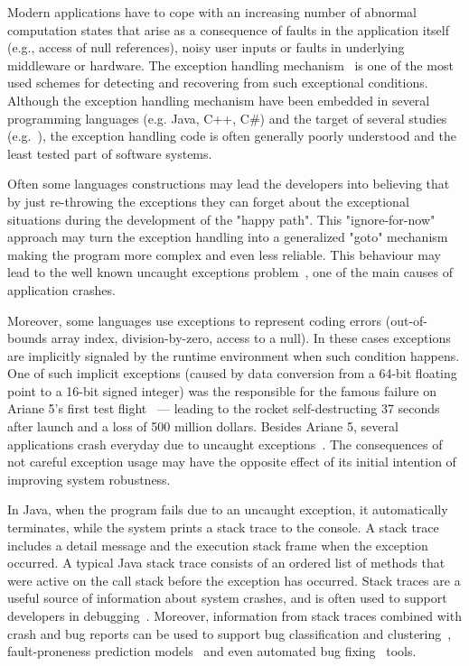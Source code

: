\documentclass[conference]{IEEEtran}
\begin{document}
Modern applications have to cope with an increasing number of abnormal
computation states that arise as a consequence of faults in the application
itself (e.g., access of null references), noisy user inputs or faults in
underlying middleware or hardware. The exception handling
mechanism~\cite{goodenough1975exception} is one of the most used schemes for
detecting and recovering from such exceptional conditions. Although the
exception handling mechanism have been embedded in several programming languages
(e.g. Java, C++, C\#) and the target of several studies
(e.g.~\cite{miller1997issues,robillard2000designing,shah2010understanding,
garcia2007extracting,garcia2001comparative,cabral2007exception,coelho2011unveiling}),
the exception handling code is often generally poorly understood and the least
tested part of software systems.

Often some languages constructions may lead the developers into believing that
by just re-throwing the exceptions they can forget about the exceptional
situations during the development of the "happy path". This "ignore-for-now"
approach may turn the exception handling into a generalized "goto"
mechanism~\cite{mandrioli1992advances} making the program more complex and even
less reliable. This behaviour may lead to the well known uncaught exceptions
problem~\cite{jo2004uncaught}, one of the main causes of application crashes.

Moreover, some languages use exceptions to represent coding errors
(out-of-bounds array index, division-by-zero, access to a null). In these cases
exceptions are implicitly signaled by the runtime environment when such
condition happens. One of such implicit exceptions (caused by data conversion
from a 64-bit floating point to a 16-bit signed integer) was the responsible for
the famous failure on Ariane 5's first test flight~\cite{lions1996ariane} ---
leading to the rocket self-destructing 37 seconds after launch and a loss of 500
million dollars. Besides Ariane 5, several applications crash everyday due to
uncaught exceptions~\cite{jo2004uncaught}. The consequences of not careful
exception usage may have the opposite effect of its initial intention of
improving system robustness.

In Java, when the program fails due to an uncaught exception, it automatically
terminates, while the system prints a stack trace to the console. A stack trace
includes a detail message and the execution stack frame when the exception
occurred. A typical Java stack trace consists of an ordered list of methods that
were active on the call stack before the exception has occurred. Stack traces
are a useful source of information about system crashes, and is often used to
support developers in debugging~\cite{schroter2010stack}. Moreover, information
from stack traces combined with crash and bug reports can be used to support bug
classification and clustering~\cite{wang2013improving, kim2011crash,
dhaliwal2011classifying}, fault-proneness prediction
models~\cite{kim2013predicting} and even automated bug
fixing~\cite{sinha2009fault} tools.
\end{document}

